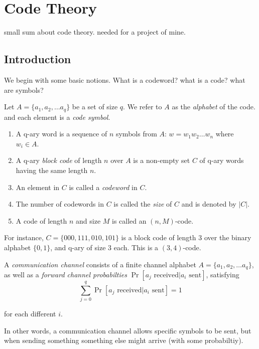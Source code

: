 \chapter{Code Theory}

small sum about code theory. needed for a project of mine.

\section{Introduction}
We begin with some basic notions. What is a codeword? what is a code? what are symbols?
\begin{definition}
    Let $A=\{a_1, a_2, \dots a_q \}$ be a set of size $q$.
    We refer to $A$ as the \emph{alphabet} of the code. and each element is a 
    \emph{code symbol}.

    \begin{enumerate}
        \item A q-ary word is a sequence of $n$ symbols from $A$:  $w=w_1w_2\dots w_n$ 
        where $w_i\in A$.
        \item A q-ary \emph{block code} of length $n$ over $A$ is a non-empty 
        set $C$ of q-ary words
        having the same length $n$.
        \item An element in $C$ is called a \emph{codeword} in $C$.
        \item The number of codewords in $C$ is called the \emph{size} of 
        $C$ and is denoted by $|C|$.
        \item A code of length $n$ and size $M$ is called an $(n,M)$-code.
    \end{enumerate}
\end{definition}

For instance, $C=\{000, 111, 010, 101\}$ is a block code of length 
$3$ over the binary alphabet $\{0,1\}$,
and q-ary of size $3$ each. This is a $(3,4)$-code.

\begin{definition}
A \emph{communication channel} consists of a finite channel alphabet 
$A=\{a_1, a_2, \dots a_q \}$, 
as well as a \emph{forward channel probabilties} 
$\Pr[a_j\text{ received}| a_i\text{ sent}]$, satisfying
$$ \sum_{j=0}^q \Pr[a_j\text{ received}| a_i\text{ sent}] = 1$$

for each different $i$.
\end{definition}

In other words, a communication channel allows specific symbols to be sent, 
but when sending something 
something else might arrive (with some probabiltiy).

